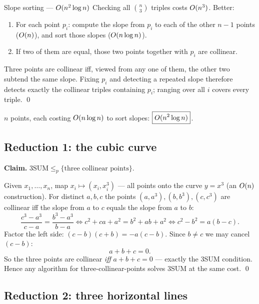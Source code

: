 \begin{algo}{Slope sorting --- $O(n^2\log n)$}
Checking all $\binom n3$ triples costs $O(n^3)$. Better:
\begin{enumerate}
  \item For each point $p_i$: compute the slope from $p_i$ to each of the other $n-1$ points
        ($O(n)$), and sort those slopes ($O(n\log n)$).
  \item If two of them are equal, those two points together with $p_i$ are collinear.
\end{enumerate}
\end{algo}

\begin{correct}
Three points are collinear iff, viewed from any one of them, the other two subtend the same slope.
Fixing $p_i$ and detecting a repeated slope therefore detects exactly the collinear triples
containing $p_i$; ranging over all $i$ covers every triple. \qed
\end{correct}

\begin{cplx}
$n$ points, each costing $O(n\log n)$ to sort slopes: $\boxed{O(n^2\log n)}$.
\end{cplx}

\subsection*{Reduction 1: the cubic curve}

\begin{correct}
\textbf{Claim.} $\mathrm{3SUM}\le_p\{\text{three collinear points}\}$.

\prf Given $x_1,\dots,x_n$, map $x_i\mapsto(x_i,x_i^3)$ --- all points onto the curve $y=x^3$
(an $O(n)$ construction). For distinct $a,b,c$ the points $(a,a^3),(b,b^3),(c,c^3)$ are collinear
iff the slope from $a$ to $c$ equals the slope from $a$ to $b$:
\[
  \frac{c^3-a^3}{c-a}=\frac{b^3-a^3}{b-a}
  \iff c^2+ca+a^2=b^2+ab+a^2
  \iff c^2-b^2=a(b-c).
\]
Factor the left side: $(c-b)(c+b)=-a(c-b)$. Since $b\ne c$ we may cancel $(c-b)$:
\[
  a+b+c=0 .
\]
So the three points are collinear \emph{iff} $a+b+c=0$ --- exactly the 3SUM condition. Hence any
algorithm for three-collinear-points solves 3SUM at the same cost. \qed
\end{correct}

\subsection*{Reduction 2: three horizontal lines}

